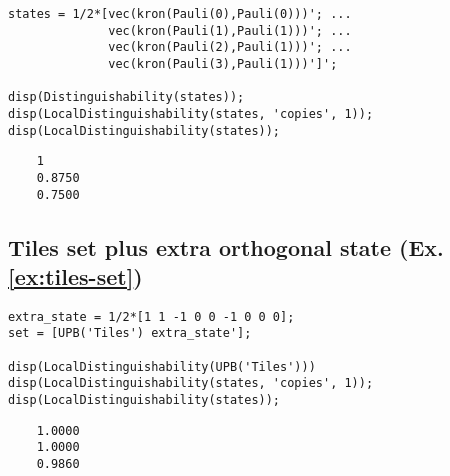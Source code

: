 \begin{verbatim}
states = 1/2*[vec(kron(Pauli(0),Pauli(0)))'; ...
              vec(kron(Pauli(1),Pauli(1)))'; ...
              vec(kron(Pauli(2),Pauli(1)))'; ...
              vec(kron(Pauli(3),Pauli(1)))']';

disp(Distinguishability(states));
disp(LocalDistinguishability(states, 'copies', 1));
disp(LocalDistinguishability(states));
\end{verbatim}\color{lightgray} 
\begin{verbatim}     
    1
    0.8750
    0.7500
\end{verbatim} 

\color{black}

\subsection*{Tiles set plus extra orthogonal state (Ex. \ref{ex:tiles-set})}

\begin{verbatim}
extra_state = 1/2*[1 1 -1 0 0 -1 0 0 0];
set = [UPB('Tiles') extra_state'];

disp(LocalDistinguishability(UPB('Tiles')))
disp(LocalDistinguishability(states, 'copies', 1));
disp(LocalDistinguishability(states));
\end{verbatim}\color{lightgray} 
\begin{verbatim}    
    1.0000
    1.0000
    0.9860
\end{verbatim}


\color{black}
